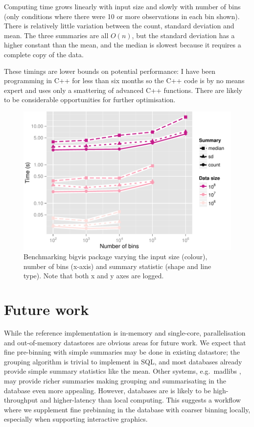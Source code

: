 \documentclass[journal]{vgtc}                %
\begin{document}
Computing time grows linearly with input size and slowly with number of bins (only conditions where there were 10 or more observations in each bin shown). There is relatively little variation between the count, standard deviation and mean. The three summaries are all $O(n)$, but the standard deviation has a higher constant than the mean, and the median is slowest because it requires a complete copy of the data. 

These timings are lower bounds on potential performance: I have been programming in C++ for less than six months so the C++ code is by no means expert and uses only a smattering of advanced C++ functions. There are likely to be considerable opportunities for further optimisation.

\begin{figure}
  \centering
   \includegraphics[width=\linewidth]{benchmark}
 \caption{Benchmarking bigvis package varying the input size (colour), number of bins (x-axis) and summary statistic (shape and line type). Note that both x and y axes are logged.}
 \label{fig:benchmark}
\end{figure}

\section{Future work}
\label{sec:conclusion}

While the reference implementation is in-memory and single-core, parallelisation and out-of-memory datastores are obvious areas for future work. We expect that fine pre-binning with simple summaries may be done in existing datastore; the grouping algorithm is trivial to implement in SQL, and most databases already provide simple summary statistics like the mean. Other systems, e.g.\ madlibs \citep{hellerstein:2012}, may provide richer summaries making grouping and summarisating in the database even more appealing. However, databases are is likely to be high-throughput and higher-latency than local computing. This suggests a workflow where we supplement fine prebinning in the database with coarser binning locally, especially when supporting interactive graphics.
\end{document}
